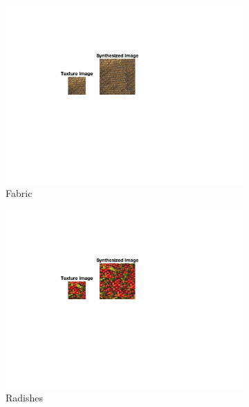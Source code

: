 \documentclass[10pt,twocolumn,letterpaper]{article}
\begin{document}
\begin{figure}
\begin{subfigure}[h]{0.33\textwidth}
         \includegraphics[trim={4.5cm 7cm 8.0cm 3cm}, clip, scale=1.5, width=\textwidth]{../results/syn_final/result_fabric_B_40.png}
         \caption{Fabric}
         \label{fig:apple_res}
     \end{subfigure}
     \hfill
     \begin{subfigure}[h]{0.33\textwidth}
        \centering
        \includegraphics[trim={4.5cm 7cm 8.0cm 3cm}, clip, scale=1.5, width=\textwidth]{../results/syn_final/result_radishes_B_40.png}
        \caption{Radishes}
        \label{fig:apple_res}
    \end{subfigure}
    \hfill
    \begin{subfigure}[h]{0.33\textwidth}
        \centering

\end{subfigure}
\end{figure}
\end{document}
